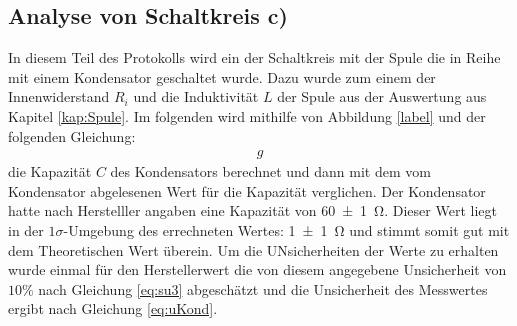 \subsection{Analyse von Schaltkreis c)}
In diesem Teil des Protokolls wird ein der Schaltkreis mit der Spule die in Reihe mit einem Kondensator geschaltet wurde.
Dazu wurde zum einem der Innenwiderstand $R_i$ und die Induktivität $L$ der Spule aus der Auswertung aus Kapitel \ref{kap:Spule}.
Im folgenden wird mithilfe von Abbildung \ref{label}
und der folgenden Gleichung:
\begin{align}
g	
\end{align}
die Kapazität $C$ des Kondensators berechnet und dann mit dem vom Kondensator abgelesenen Wert für die Kapazität verglichen.
Der Kondensator hatte nach Herstelller angaben eine Kapazität von \SI{60+-1}{\ohm}.
Dieser Wert liegt in der $1\sigma$-Umgebung des errechneten Wertes: \SI{1+-1}{\ohm} und stimmt somit gut mit dem Theoretischen Wert überein.
Um die UNsicherheiten der Werte zu erhalten wurde einmal für den Herstellerwert die von diesem angegebene Unsicherheit von $10\%$ nach Gleichung
\ref{eq:su3} abgeschätzt und die Unsicherheit des Messwertes ergibt nach Gleichung \ref{eq:uKond}.
